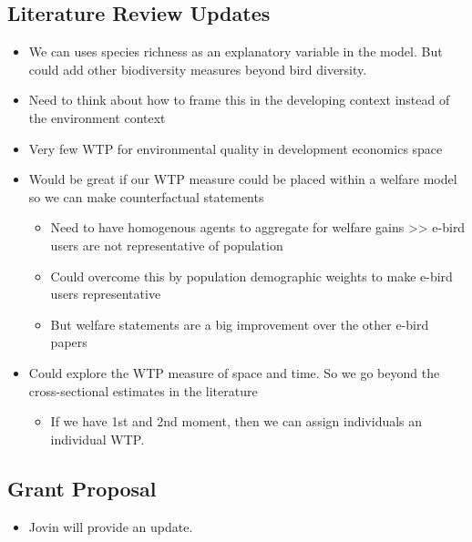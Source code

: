 \documentclass[
  letterpaper,
]{article}
\providecommand{\tightlist}{%
  \setlength{\itemsep}{0pt}\setlength{\parskip}{0pt}}\usepackage{longtable,booktabs,array}
\begin{document}
\begin{tcolorbox}
\subsection{Literature Review Updates}\label{literature-review-updates}

\begin{itemize}
\tightlist
\item
  We can uses species richness as an explanatory variable in the model.
  But could add other biodiversity measures beyond bird diversity.
\item
  Need to think about how to frame this in the developing context
  instead of the environment context
\item
  Very few WTP for environmental quality in development economics space
\item
  Would be great if our WTP measure could be placed within a welfare
  model so we can make counterfactual statements

  \begin{itemize}
  \tightlist
  \item
    Need to have homogenous agents to aggregate for welfare gains
    \textgreater\textgreater{} e-bird users are not representative of
    population
  \item
    Could overcome this by population demographic weights to make e-bird
    users representative
  \item
    But welfare statements are a big improvement over the other e-bird
    papers
  \end{itemize}
\item
  Could explore the WTP measure of space and time. So we go beyond the
  cross-sectional estimates in the literature

  \begin{itemize}
  \tightlist
  \item
    If we have 1st and 2nd moment, then we can assign individuals an
    individual WTP.
  \end{itemize}
\end{itemize}

\subsection{Grant Proposal}\label{grant-proposal}

\begin{itemize}
\tightlist
\item
  Jovin will provide an update.
\end{itemize}


\end{tcolorbox}
\end{document}
